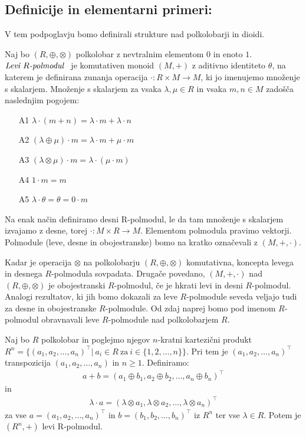 \documentclass[mat1]{fmfdelo}
\newcommand{\pojem}[1]{\ensuremath{\emph{#1}}}
\newcommand{\map}[3]{\ensuremath{{#1}:{#2}\rightarrow{#3}}}
\begin{document}
\subsection{Definicije in elementarni primeri:} \label{subsect:semimoduledef}
V tem podpoglavju bomo definirali stru\-kture nad polkolobarji in dioidi.

\begin{definicija}\label{def:polmodul}
	Naj bo $(R, \oplus, \otimes)$ polkolobar z nevtralnim elementom $0$ in enoto $1$.\pojem{Levi $R$-polmodul}~ je komutativen monoid $(M, +)$ z aditivno identiteto $\theta$, na katerem je definirana zunanja operacija \map{\cdot}{R\times M}{M}, ki jo imenujemo množenje s skalarjem. Množenje s skalarjem za vsaka $\lambda,\mu\in R$ in vsaka $m, n\in M$ zadošča naslednjim pogojem:
	\begin{enumerate}
		\item[A1] $\lambda\cdot(m + n) = \lambda\cdot m + \lambda\cdot n$
		\item[A2] $(\lambda \oplus \mu)\cdot m = \lambda\cdot m + \mu\cdot m$
		\item[A3]  $(\lambda\otimes\mu) \cdot m = \lambda \cdot (\mu \cdot m)$
		\item[A4] $1\cdot m = m$
		\item[A5] $\lambda\cdot\theta = \theta = 0\cdot m$
	\end{enumerate}

Na enak način definiramo desni R-polmodul, le da tam množenje s skalarjem izvajamo z desne, torej \map{\cdot}{M\times R}{M}. Elementom polmodula pravimo vektorji. Polmodule (leve, desne in obojestranske) bomo na kratko označevali z $(M, +, \cdot)$.
\end{definicija}

	 Kadar je operacija $\otimes$ na polkolobarju $(R,\oplus, \otimes)$ komutativna, koncepta levega in desnega $R$-polmodula sovpadata. Drugače povedano, $(M, +, \cdot)$ nad $(R, \oplus, \otimes)$ je obojestranski $R$-polmodul, če je hkrati levi in desni $R$-polmodul. Analogi rezultatov, ki jih bomo dokazali za leve $R$-polmodule seveda veljajo  tudi za desne in obojestranske $R$-polmodule. Od zdaj naprej bomo pod imenom $R$-polmodul obravnavali leve $R$-polmodule nad polkolobarjem $R$.

\begin{zgled}
	\label{zgled:Rnpolmodul}
	Naj bo $R$ polkolobar in poglejmo njegov $n$-kratni kartezični produkt $R^n = \{(a_1, a_2, \ldots, a_n)^{\top} |~ a_i \in R~\text{za}~i\in \{1, 2, \ldots, n\}\}$. Pri tem je $(a_1, a_2, \ldots, a_n)^{\top}$ transpozicija $(a_1, a_2, \ldots, a_n)$ in $n\geq 1$. Definiramo:
	\begin{align*}
		a + b = (a_1 \oplus b_1, a_2 \oplus b_2, \ldots, a_n \oplus b_n)^{\top}
	\end{align*}
	in
	\begin{align*}
		\lambda\cdot a = (\lambda\otimes a_1,\lambda\otimes a_2, \ldots,\lambda\otimes a_n)^{\top}
	\end{align*}
	za vse $a = (a_1, a_2, \ldots, a_n)^{\top}$ in $b = (b_1, b_2, \ldots, b_n)^{\top}$ iz $R^n$ ter vse $\lambda \in R$. Potem je $(R^n, +)$ levi R-polmodul.
\end{zgled}
\end{document}
